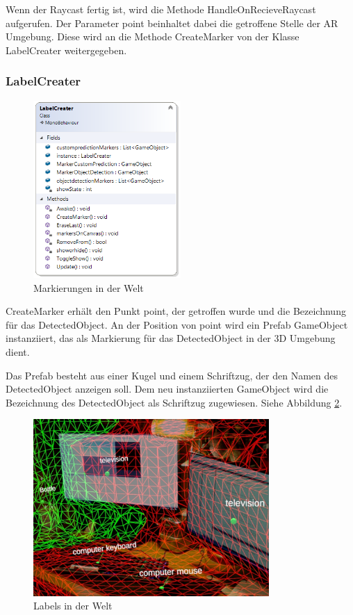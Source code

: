 Wenn der Raycast fertig ist, wird die Methode HandleOnRecieveRaycast aufgerufen. Der Parameter point beinhaltet dabei die getroffene Stelle der AR Umgebung.
Diese wird an die Methode CreateMarker von der Klasse LabelCreater weitergegeben.

\subsubsection{LabelCreater}

\begin{figure}
	\centering
	\includegraphics[width=0.5\textwidth]{images/dia_labelcreater.PNG}
	\caption[]{Markierungen in der Welt}
	\label{dia:labelcreater}
\end{figure}

CreateMarker erhält den Punkt point, der getroffen wurde und die Bezeichnung für das DetectedObject. An der Position von point wird ein Prefab GameObject instanziiert, das als Markierung für das DetectedObject in der 3D Umgebung dient.

Das Prefab besteht aus einer Kugel und einem Schriftzug, der den Namen des DetectedObject anzeigen soll. Dem neu instanziierten GameObject wird die Bezeichnung des DetectedObject als Schriftzug zugewiesen. Siehe Abbildung \ref{image:labels}.

\begin{figure}[H]
	\centering
	\includegraphics[width=0.8\textwidth]{images/ML_20201004_19.10.05_2.jpg}
	\caption[]{Labels in der Welt}
	\label{image:labels}
\end{figure}

